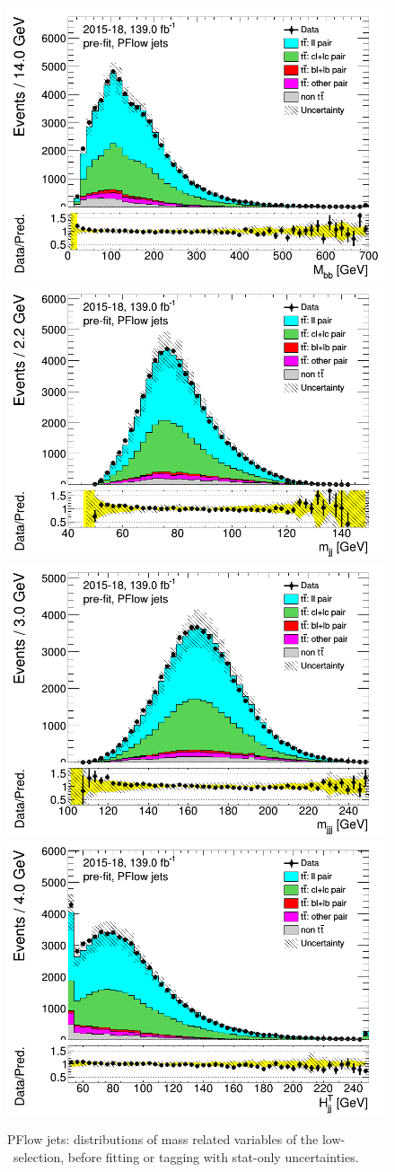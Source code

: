 \newpage
\begin{figure}[H]
\includegraphics[width=.45\textwidth]{FTAG_plots/pretagNoRwLowpTPFlowall/DataMC_h_Mbb.png}
\includegraphics[width=.45\textwidth]{FTAG_plots/pretagNoRwLowpTPFlowall/DataMC_h_mjj.png}\\
\includegraphics[width=.45\textwidth]{FTAG_plots/pretagNoRwLowpTPFlowall/DataMC_h_mjjj.png}
\includegraphics[width=.45\textwidth]{FTAG_plots/pretagNoRwLowpTPFlowall/DataMC_h_Htjj.png}\\
\caption{PFlow jets: distributions of mass related variables of the low-\pt\ selection, 
before fitting or 
tagging with stat-only uncertainties.} \label{fig:lowpT_mass_PFlow}
\end{figure}

